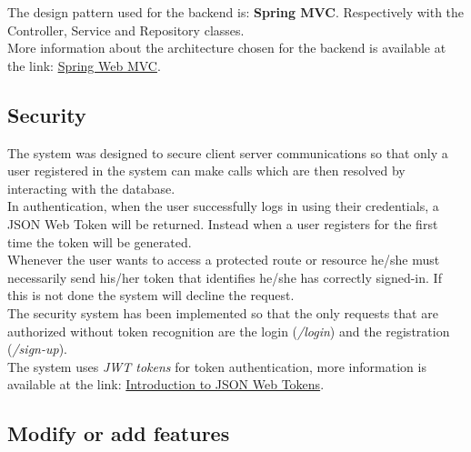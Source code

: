 The design pattern used for the backend is: \textbf{Spring MVC}.
Respectively with the Controller, Service and Repository classes.
\\ 
More information about the architecture chosen for the backend is available at the link: \href{https://docs.spring.io/spring/docs/current/spring-framework-reference/web.html}{Spring Web MVC}.


\subsection{Security}
The system was designed to secure client server communications so that only a user registered in the system can make calls which are then resolved by interacting with the database.\\
In authentication, when the user successfully logs in using their credentials, a JSON Web Token will be returned. Instead when a user registers for the first time the token will be generated.\\
Whenever the user wants to access a protected route or resource he/she must necessarily send his/her token that identifies he/she has correctly signed-in. If this is not done the system will decline the request.\\
The security system has been implemented so that the only requests that are authorized without token recognition are the login (\textit{/login}) and the registration (\textit{/sign-up}).\\
The system uses \textit{JWT tokens} for token authentication, more information is available at the link: \href{https://jwt.io/introduction/}{Introduction to JSON Web Tokens}.

\subsection{Modify or add features}
